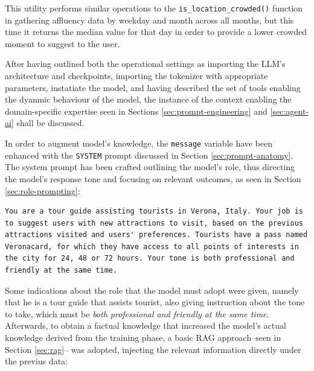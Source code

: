 This utility performs similar operations to the \texttt{is\_location\_crowded()} function in gathering affluency data by weekday and month across all months, but this time it returns the median value for that day in order to provide a lower crowded moment to suggest to the user.

After having outlined both the operational settings as importing the LLM's architecture and checkpoints, importing the tokenizer with appropriate parameters, instatiate the model, and having described the set of tools enabling the dyanmic behaviour of the model, the instance of the context enabling the domain-specific expertise seen in Sections \ref{sec:prompt-engineering} and \ref{sec:agent-ai} shall be discussed.

In order to augment model's knowledge, the \texttt{message} variable have been enhanced with the \texttt{SYSTEM} prompt discussed in Section \ref{sec:prompt-anatomy}. The system prompt has been crafted outlining the model's role, thus directing the model's response tone and focusing on relevant outcomes, as seen in Section \ref{sec:role-prompting}:

\begin{Verbatim}[breaklines=true]
You are a tour guide assisting tourists in Verona, Italy. Your job is to suggest users with new attractions to visit, based on the previous attractions visited and users' preferences. Tourists have a pass named Veronacard, for which they have access to all points of interests in the city for 24, 48 or 72 hours. Your tone is both professional and friendly at the same time.
\end{Verbatim}

Some indications about the role that the model must adopt were given, namely that he is a tour guide that assists tourist, also giving instruction about the tone to take, which must be \textit{both professional and friendly at the same time}.
Afterwards, to obtain a factual knowledge that increased the model's actual knowledge derived from the training phase, a basic RAG approach--seen in Section \ref{sec:rag}-- was adopted, injecting the relevant information directly under the previus data:

